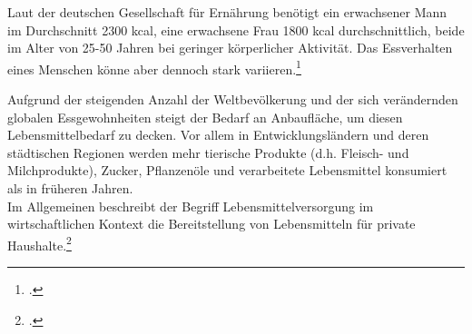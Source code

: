 \documentclass{scrartcl}
\begin{document}
Laut der deutschen Gesellschaft für Ernährung benötigt ein erwachsener Mann im Durchschnitt 2300 kcal, eine erwachsene Frau 1800 kcal durchschnittlich, beide im Alter von 25-50 Jahren bei geringer körperlicher Aktivität. Das Essverhalten eines Menschen könne aber dennoch stark variieren.\footcite[Vgl.]{DeutscheGesellschaftfurErnahrunge.V.2015WieMensch} 

Aufgrund der steigenden Anzahl der Weltbevölkerung und der sich verändernden globalen Essgewohnheiten steigt der Bedarf an Anbaufläche, um diesen Lebensmittelbedarf zu decken. Vor allem in Entwicklungsländern und deren städtischen Regionen werden mehr tierische Produkte (d.h. Fleisch- und Milchprodukte), Zucker, Pflanzenöle und verarbeitete Lebensmittel konsumiert als in früheren Jahren. \\

Im Allgemeinen beschreibt der Begriff Lebensmittelversorgung im wirtschaftlichen Kontext die Bereitstellung von Lebensmitteln für private Haushalte.\footcite{UmweltbelastungenUmweltbundesamt}
\end{document}
